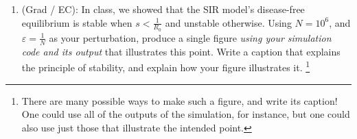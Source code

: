 \documentclass[11pt]{article}
\begin{document}
\begin{enumerate}
\clearpage
\item (Grad / EC): In class, we showed that the SIR model's disease-free equilibrium is stable when $s<\tfrac{1}{R_0}$ and unstable otherwise. 
	  Using $N=10^6$, and $\varepsilon = \frac{1}{N}$ as your perturbation, 
	  produce a single figure {\it using your simulation code and its output} that illustrates this point.
	  Write a caption that explains the principle of stability, and explain how your figure illustrates it.
\footnote{There are many possible ways to make such a figure, and write its caption! 
One could use all of the outputs of the simulation, for instance, 
but one could also use just those that illustrate the intended point.}

\end{enumerate}
\end{document}
